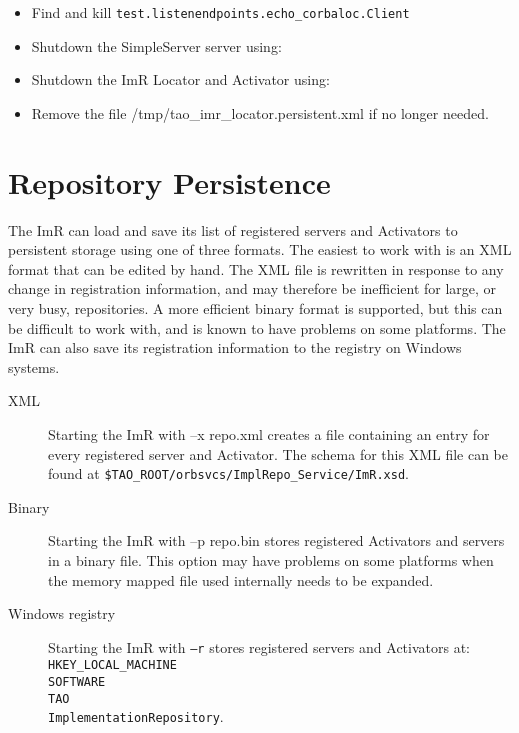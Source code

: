 \begin{itemize}
    \item Find and kill {\tt test.listenendpoints.echo\_corbaloc.Client}
    \item Shutdown the SimpleServer server using:


    \item Shutdown the ImR Locator and Activator using:


    \item Remove the file /tmp/tao\_imr\_locator.persistent.xml if no longer needed.
\end{itemize}

\section{Repository Persistence}

The ImR can load and save its list of registered servers and Activators to
persistent storage using one of three formats. The easiest to work with is
an XML format that can be edited by hand. The XML file is rewritten in
response to any change in registration information, and may therefore be
inefficient for large, or very busy, repositories. A more efficient binary
format is supported, but this can be difficult to work with, and is known
to have problems on some platforms. The ImR can also save its registration
information to the registry on Windows systems.

\begin{description}
    \item [XML] Starting the ImR with –x repo.xml creates a file containing
              an entry for every registered server and Activator. The schema for
              this XML file can be found at
              {\tt \$TAO\_ROOT/orbsvcs/ImplRepo\_Service/ImR.xsd}.

    \item [Binary] Starting the ImR with –p repo.bin stores registered
              Activators  and servers in a binary file.   This option may have
              problems on some platforms when the memory mapped file
              used internally needs to be expanded.

    \item [Windows registry] Starting the ImR with {\tt –r} stores registered servers
               and Activators at:
               {\tt HKEY\_LOCAL\_MACHINE\\SOFTWARE\\TAO\\ImplementationRepository}.
 \end{description}

